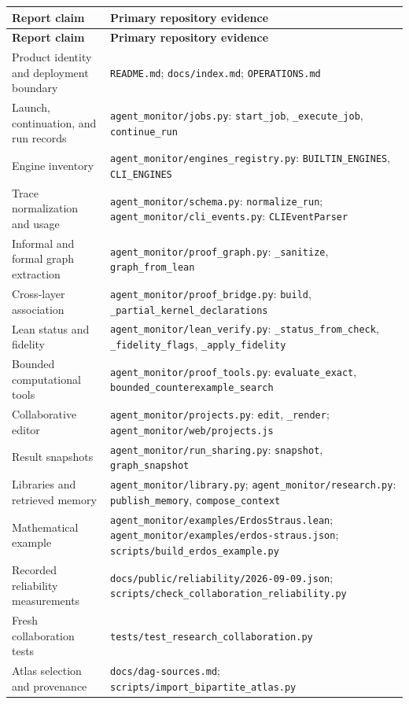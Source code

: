 \documentclass[11pt,a4paper]{article}
\begin{document}
\begingroup\small
\setlength{\tabcolsep}{4pt}
\begin{longtable}{>{\raggedright\arraybackslash}p{0.31\dimexpr\linewidth-4\tabcolsep\relax}>{\raggedright\arraybackslash}p{0.69\dimexpr\linewidth-4\tabcolsep\relax}}
\toprule
\textbf{Report claim} & \textbf{Primary repository evidence} \\
\midrule\endfirsthead
\toprule
\textbf{Report claim} & \textbf{Primary repository evidence} \\
\midrule\endhead
\bottomrule\endfoot
Product identity and deployment boundary & \nolinkurl{README.md}; \nolinkurl{docs/index.md}; \nolinkurl{OPERATIONS.md} \\
Launch, continuation, and run records & \nolinkurl{agent_monitor/jobs.py}: \nolinkurl{start_job}, \nolinkurl{_execute_job}, \nolinkurl{continue_run} \\
Engine inventory & \nolinkurl{agent_monitor/engines_registry.py}: \nolinkurl{BUILTIN_ENGINES}, \nolinkurl{CLI_ENGINES} \\
Trace normalization and usage & \nolinkurl{agent_monitor/schema.py}: \nolinkurl{normalize_run}; \nolinkurl{agent_monitor/cli_events.py}: \nolinkurl{CLIEventParser} \\
Informal and formal graph extraction & \nolinkurl{agent_monitor/proof_graph.py}: \nolinkurl{_sanitize}, \nolinkurl{graph_from_lean} \\
Cross-layer association & \nolinkurl{agent_monitor/proof_bridge.py}: \nolinkurl{build}, \nolinkurl{_partial_kernel_declarations} \\
Lean status and fidelity & \nolinkurl{agent_monitor/lean_verify.py}: \nolinkurl{_status_from_check}, \nolinkurl{_fidelity_flags}, \nolinkurl{_apply_fidelity} \\
Bounded computational tools & \nolinkurl{agent_monitor/proof_tools.py}: \nolinkurl{evaluate_exact}, \nolinkurl{bounded_counterexample_search} \\
Collaborative editor & \nolinkurl{agent_monitor/projects.py}: \nolinkurl{edit}, \nolinkurl{_render}; \nolinkurl{agent_monitor/web/projects.js} \\
Result snapshots & \nolinkurl{agent_monitor/run_sharing.py}: \nolinkurl{snapshot}, \nolinkurl{graph_snapshot} \\
Libraries and retrieved memory & \nolinkurl{agent_monitor/library.py}; \nolinkurl{agent_monitor/research.py}: \nolinkurl{publish_memory}, \nolinkurl{compose_context} \\
Mathematical example & \nolinkurl{agent_monitor/examples/ErdosStraus.lean}; \nolinkurl{agent_monitor/examples/erdos-straus.json}; \nolinkurl{scripts/build_erdos_example.py} \\
Recorded reliability measurements & \nolinkurl{docs/public/reliability/2026-09-09.json}; \nolinkurl{scripts/check_collaboration_reliability.py} \\
Fresh collaboration tests & \nolinkurl{tests/test_research_collaboration.py} \\
Atlas selection and provenance & \nolinkurl{docs/dag-sources.md}; \nolinkurl{scripts/import_bipartite_atlas.py} \\
\end{longtable}
\endgroup
\end{document}
